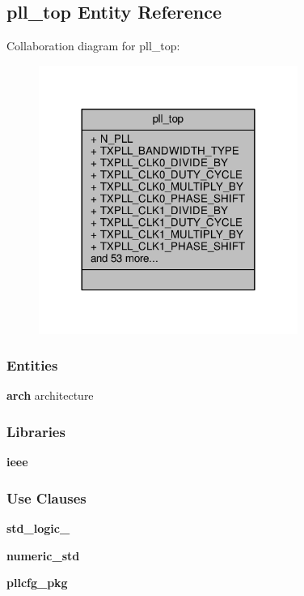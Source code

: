 \subsection{pll\+\_\+top Entity Reference}
\label{classpll__top}


Collaboration diagram for pll\+\_\+top\+:\nopagebreak
\begin{figure}[H]
\begin{center}
\leavevmode
\includegraphics[width=240pt]{d0/dcc/classpll__top__coll__graph}
\end{center}
\end{figure}
\subsubsection*{Entities}
\begin{DoxyCompactItemize}
\item 
{\bf arch} architecture
\end{DoxyCompactItemize}
\subsubsection*{Libraries}
 \begin{DoxyCompactItemize}
\item 
{\bf ieee} 
\end{DoxyCompactItemize}
\subsubsection*{Use Clauses}
 \begin{DoxyCompactItemize}
\item 
{\bf std\+\_\+logic\+\_}   
\item 
{\bf numeric\+\_\+std}   
\item 
{\bf pllcfg\+\_\+pkg}   
\end{DoxyCompactItemize}
